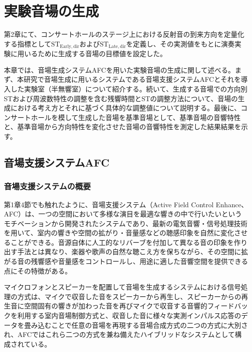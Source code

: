 \documentclass[11pt,a4j]{jreport}
\begin{document}
\chapter{実験音場の生成}

第2章にて、コンサートホールのステージ上における反射音の到来方向を定量化する指標として$\mathrm{ST_{Early,dir}}$および$\mathrm{ST_{Late,dir}}$を定義し、その実測値をもとに演奏実験に用いるために生成する音場の目標値を設定した。

本章では、音場生成システムAFCを用いた実験音場の生成に関して述べる。まず、本研究で音場生成に用いるシステムである音場支援システムAFCとそれを導入した実験室（半無響室）について紹介する。続いて、生成する音場での方向別STおよび周波数特性の調整を含む残響時間とSTの調整方法について、音場の生成における考え方とそれに基づく具体的な調整値について説明する。最後に、コンサートホールを模して生成した音場を基準音場として、基準音場の音響特性と、基準音場から方向特性を変化させた音場の音響特性を測定した結果結果を示す。


\section{音場支援システムAFC}

\subsection*{音場支援システムの概要}
第1章4節でも触れたように、音場支援システム（Active Field Control Enhance、AFC）は、一つの空間において多様な演目を最適な響きの中で行いたいというモチベーションから開発されたシステムであり、最新の電気音響・信号処理技術を用いて、室内の響きや空間の拡がり・音量感などの聴感印象を自然に変化させることができる\cite{AFCの概要}。音源自体に人工的なリバーブを付加して異なる音の印象を作り出す手法とは異なり、楽器や歌声の自然な聴こえ方を保ちながら、その空間に拡がる音の残響感や音量感をコントロールし、用途に適した音響空間を提供できる点にその特徴がある。

マイクロフォンとスピーカーを配置して音場を生成するシステムにおける信号処理の方式は、マイクで収音した音をスピーカーから再生し、スピーカーからの再生音に空間固有の響きが加わった音を再びマイクで収音する音響的フィードバックを利用する室内音場制御方式と、収音した音に様々な実測インパルス応答のデータを畳み込むことで任意の音場を再現する音場合成方式の二つの方式に大別され、AFCではこれら二つの方式を兼ね備えたハイブリッドなシステムとして構成されている\cite{AFCEnhance}。

\newpage
\end{document}
